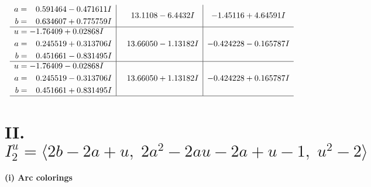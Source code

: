 \documentclass[1p]{elsarticle_modified}
\theoremstyle{definition}
\begin{document}
$$\begin{array}{c|c|c}
\begin{aligned}
a &= \phantom{-}0.591464 - 0.471611 I \\
b &= \phantom{-}0.634607 + 0.775759 I\end{aligned}
 & \phantom{-}13.1108 - 6.4432 I & -1.45116 + 4.64591 I \\ \hline\begin{aligned}
u &= -1.76409 + 0.02868 I \\
a &= \phantom{-}0.245519 + 0.313706 I \\
b &= \phantom{-}0.451661 - 0.831495 I\end{aligned}
 & \phantom{-}13.66050 - 1.13182 I & -0.424228 - 0.165787 I \\ \hline\begin{aligned}
u &= -1.76409 - 0.02868 I \\
a &= \phantom{-}0.245519 - 0.313706 I \\
b &= \phantom{-}0.451661 + 0.831495 I\end{aligned}
 & \phantom{-}13.66050 + 1.13182 I & -0.424228 + 0.165787 I\\
 \hline 
 \end{array}$$\newpage\newpage\renewcommand{\arraystretch}{1}
\centering \section*{II. $I^u_{2}= \langle 2 b-2 a+u,\;2 a^2-2 a u-2 a+u-1,\;u^2-2 \rangle$}
\flushleft \textbf{(i) Arc colorings}\\
\end{document}
